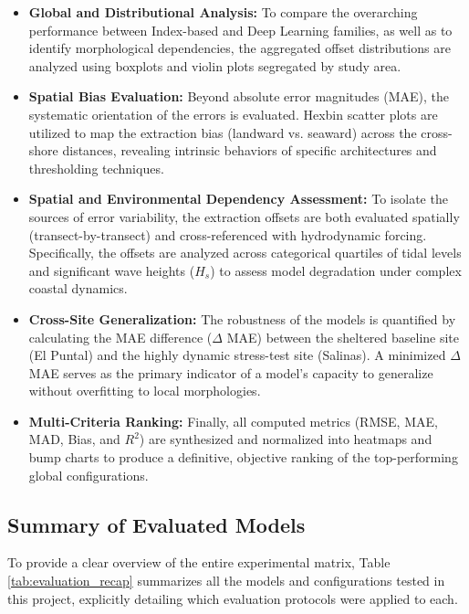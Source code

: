 ﻿\documentclass[ENG]{TFUOC}%
\begin{document}
\begin{itemize}
    \item \textbf{Global and Distributional Analysis:} To compare the overarching performance between Index-based and Deep Learning families, as well as to identify morphological dependencies, the aggregated offset distributions are analyzed using boxplots and violin plots segregated by study area.
    \item \textbf{Spatial Bias Evaluation:} Beyond absolute error magnitudes (MAE), the systematic orientation of the errors is evaluated. Hexbin scatter plots are utilized to map the extraction bias (landward vs. seaward) across the cross-shore distances, revealing intrinsic behaviors of specific architectures and thresholding techniques.
    \item \textbf{Spatial and Environmental Dependency Assessment:} To isolate the sources of error variability, the extraction offsets are both evaluated spatially (transect-by-transect) and cross-referenced with hydrodynamic forcing. Specifically, the offsets are analyzed across categorical quartiles of tidal levels and significant wave heights ($H_s$) to assess model degradation under complex coastal dynamics.
    \item \textbf{Cross-Site Generalization:} The robustness of the models is quantified by calculating the MAE difference ($\Delta$ MAE) between the sheltered baseline site (El Puntal) and the highly dynamic stress-test site (Salinas). A minimized $\Delta$ MAE serves as the primary indicator of a model's capacity to generalize without overfitting to local morphologies.
    \item \textbf{Multi-Criteria Ranking:} Finally, all computed metrics (RMSE, MAE, MAD, Bias, and $R^2$) are synthesized and normalized into heatmaps and bump charts to produce a definitive, objective ranking of the top-performing global configurations.
\end{itemize}

\subsection{Summary of Evaluated Models}

To provide a clear overview of the entire experimental matrix, Table \ref{tab:evaluation_recap} summarizes all the models and configurations tested in this project, explicitly detailing which evaluation protocols were applied to each.
\end{document}

